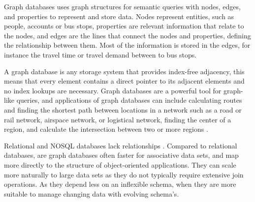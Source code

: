 Graph databases uses graph structures for semantic queries with nodes, edges, and properties to represent and store data.
Nodes represent entities, such as people, accounts or bus stops, properties are relevant information that relate to the nodes, and edges are the lines that connect the nodes and properties, defining the relationship between them. Most of the information is stored in the edges, for instance the travel time or travel demand between to bus stops. 

A graph database is any storage system that provides index-free adjacency, this means that every element contains a direct pointer to its adjacent elements and no index lookups are necessary. Graph databases are a powerful tool for graph-like queries, and applications of graph databases can include calculating routes and finding the shortest path between locations in a network such as a road or rail network, airspace network, or logistical network, finding the center of a region, and calculate the intersection between two or more regions \citep{robinson13}.




\par %

Relational and NOSQL databases lack relationships \citep{robinson13}. Compared to relational databases, are graph databases often faster for associative data sets, and map more directly to the structure of object-oriented applications. They can scale more naturally to large data sets as they do not typically require extensive join operations. As they depend less on an inflexible schema, when they are more suitable to manage changing data with evolving schema's.

\par

